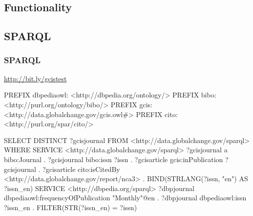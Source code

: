 \documentclass{beamer}
\begin{document}
\subsection{Functionality}

\subsection{SPARQL}
\begin{frame}[fragile]
    \frametitle{SPARQL}
     \url{http://bit.ly/gcistest}
\begin{tiny}
\begin{semiverbatim}
PREFIX dbpediaowl: <http://dbpedia.org/ontology/>
PREFIX bibo: <http://purl.org/ontology/bibo/>
PREFIX gcis: <http://data.globalchange.gov/gcis.owl#>
PREFIX cito: <http://purl.org/spar/cito/>

SELECT DISTINCT ?gcisjournal
FROM <http://data.globalchange.gov/sparql>
WHERE {
{
   SERVICE <http://data.globalchange.gov/sparql> {
     ?gcisjournal a bibo:Journal .
     ?gcisjournal bibo:issn ?issn .
     ?gcisarticle gcis:inPublication ?gcisjournal .
     ?gcisarticle cito:isCitedBy <http://data.globalchange.gov/report/nca3> .
   } 
   BIND(STRLANG(?issn, "en") AS ?issn_en)
}  
   SERVICE <http://dbpedia.org/sparql> {
     ?dbpjournal dbpediaowl:frequencyOfPublication "Monthly"@en .
     ?dbpjournal dbpediaowl:issn ?issn_en .
     FILTER(STR(?issn_en) = ?issn)
   } 
}  
\end{semiverbatim}
\end{tiny}

\end{frame}
\end{document}

